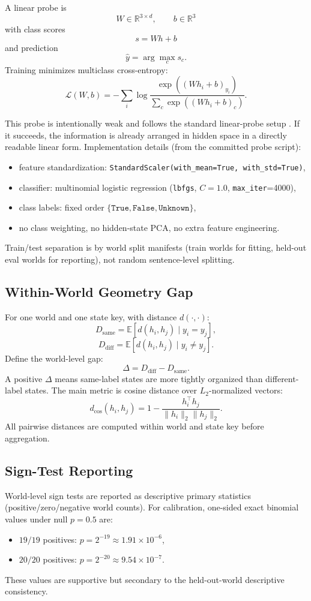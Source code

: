 \documentclass[11pt]{article}
\begin{document}
A linear probe is
\[
W \in \mathbb{R}^{3\times d}, \qquad b \in \mathbb{R}^3
\]
with class scores
\[
s = Wh + b
\]
and prediction
\[
\hat y = \arg\max_c s_c.
\]
Training minimizes multiclass cross-entropy:
\[
\mathcal{L}(W,b) = -\sum_i
\log \frac{\exp((Wh_i+b)_{y_i})}{\sum_c \exp((Wh_i+b)_c)}.
\]

This probe is intentionally weak and follows the standard linear-probe setup \cite{alain2016probes}.
If it succeeds, the information is already arranged in hidden space in a directly readable linear form.
Implementation details (from the committed probe script):
\begin{itemize}
  \item feature standardization: \texttt{StandardScaler(with\_mean=True, with\_std=True)},
  \item classifier: multinomial logistic regression (\texttt{lbfgs}, \(C=1.0\), \texttt{max\_iter}=4000),
  \item class labels: fixed order \(\{\texttt{True},\texttt{False},\texttt{Unknown}\}\),
  \item no class weighting, no hidden-state PCA, no extra feature engineering.
\end{itemize}
Train/test separation is by world split manifests (train worlds for fitting, held-out eval worlds for reporting), not random sentence-level splitting.

\subsection{Within-World Geometry Gap}
For one world and one state key, with distance \(d(\cdot,\cdot)\):
\[
D_{\text{same}} = \mathbb{E}[d(h_i,h_j) \mid y_i = y_j],
\]
\[
D_{\text{diff}} = \mathbb{E}[d(h_i,h_j) \mid y_i \neq y_j].
\]
Define the world-level gap:
\[
\Delta = D_{\text{diff}} - D_{\text{same}}.
\]
A positive \(\Delta\) means same-label states are more tightly organized than different-label states.
The main metric is cosine distance over \(L_2\)-normalized vectors:
\[
d_{\cos}(h_i,h_j)=1-\frac{h_i^\top h_j}{\lVert h_i\rVert_2 \lVert h_j\rVert_2}.
\]
All pairwise distances are computed within world and state key before aggregation.

\subsection{Sign-Test Reporting}
World-level sign tests are reported as descriptive primary statistics (positive/zero/negative world counts).
For calibration, one-sided exact binomial values under null \(p=0.5\) are:
\begin{itemize}
  \item \(19/19\) positives: \(p=2^{-19}\approx 1.91\times10^{-6}\),
  \item \(20/20\) positives: \(p=2^{-20}\approx 9.54\times10^{-7}\).
\end{itemize}
These values are supportive but secondary to the held-out-world descriptive consistency.
\end{document}
